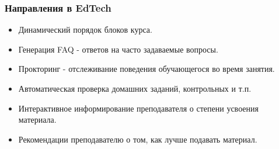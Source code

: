 \documentclass[default]{beamer}
\begin{document}
	
	\begin{frame}
		\frametitle{Направления в EdTech}
	
		\begin{itemize}
			\item Динамический порядок блоков курса.
			\item Генерация FAQ - ответов на часто задаваемые вопросы.
			\item Прокторинг - отслеживание поведения обучающегося во время занятия.
			\item Автоматическая проверка домашних заданий, контрольных и т.п.
			\item Интерактивное информирование преподавателя о степени усвоения материала.
			\item Рекомендации преподавателю о том, как лучше подавать материал.
		\end{itemize}
	

\end{frame}
\end{document}

